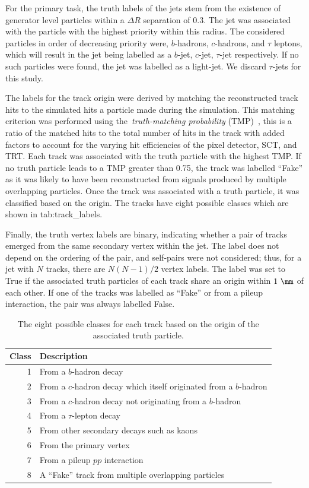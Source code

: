 For the primary task, the truth labels of the jets stem from the existence of generator level particles within a $\Delta R$ separation of 0.3.
The jet was associated with the particle with the highest priority within this radius.
The considered particles in order of decreasing priority were, $b$-hadrons, $c$-hadrons, and $\tau$ leptons, which will result in the jet being labelled as a $b$-jet, $c$-jet, $\tau$-jet respectively.
If no such particles were found, the jet was labelled as a light-jet.
We discard $\tau$-jets for this study.

The labels for the track origin were derived by matching the reconstructed track hits to the simulated hits a particle made during the \geant simulation.
This matching criterion was performed using the~\textit{truth-matching probability} (TMP)~\cite{PerformanceATLASTrack}, this is a ratio of the matched hits to the total number of hits in the track with added factors to account for the varying hit efficiencies of the pixel detector, SCT, and TRT\@.
Each track was associated with the truth particle with the highest TMP\@.
If no truth particle leads to a TMP greater than 0.75, the track was labelled ``Fake'' as it was likely to have been reconstructed from signals produced by multiple overlapping particles.
Once the track was associated with a truth particle, it was classified based on the origin.
The tracks have eight possible classes which are shown in \Cref
{tab:track_labels}.

Finally, the truth vertex labels are binary, indicating whether a pair of tracks emerged from the same secondary vertex within the jet.
The label does not depend on the ordering of the pair, and self-pairs were not considered; thus, for a jet with $N$ tracks, there are $N(N-1)/2$ vertex labels.
The label was set to True if the associated truth particles of each track share an origin within $1~\mm$ of each other.
If one of the tracks was labelled as ``Fake'' or from a pileup interaction, the pair was always labelled False.

\begin{table}
    \centering
    \begin{tabular}{rl}
        \toprule
        Class & Description \\
        \midrule
        1 & From a $b$-hadron decay \\
        2 & From a $c$-hadron decay which itself originated from a $b$-hadron \\
        3 & From a $c$-hadron decay not originating from a $b$-hadron \\
        4 & From a $\tau$-lepton decay \\
        5 & From other secondary decays such as kaons \\
        6 & From the primary vertex \\
        7 & From a pileup $pp$ interaction \\
        8 & A ``Fake'' track from multiple overlapping particles \\
        \bottomrule
    \end{tabular}
    \caption{The eight possible classes for each track based on the origin of the associated truth particle.}
    \label{tab:track_labels}
\end{table}

